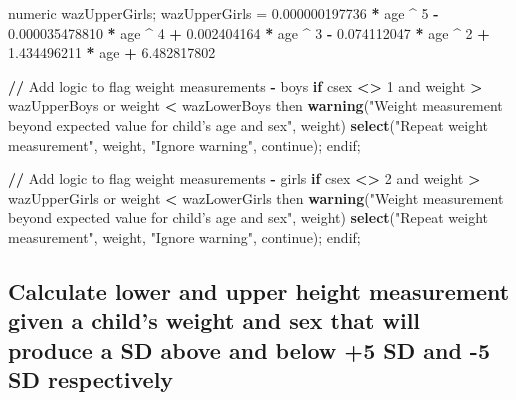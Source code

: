 \documentclass[12pt,a4paper]{article}
\newenvironment{Shaded}{\begin{snugshade}}{\end{snugshade}}
\newcommand{\KeywordTok}[1]{\textcolor[rgb]{0.13,0.29,0.53}{\textbf{#1}}}
\newcommand{\DecValTok}[1]{\textcolor[rgb]{0.00,0.00,0.81}{#1}}
\newcommand{\FloatTok}[1]{\textcolor[rgb]{0.00,0.00,0.81}{#1}}
\newcommand{\StringTok}[1]{\textcolor[rgb]{0.31,0.60,0.02}{#1}}
\newcommand{\ControlFlowTok}[1]{\textcolor[rgb]{0.13,0.29,0.53}{\textbf{#1}}}
\newcommand{\OperatorTok}[1]{\textcolor[rgb]{0.81,0.36,0.00}{\textbf{#1}}}
\newcommand{\ErrorTok}[1]{\textcolor[rgb]{0.64,0.00,0.00}{\textbf{#1}}}
\newcommand{\NormalTok}[1]{#1}
\theoremstyle{definition}
\theoremstyle{definition}
\theoremstyle{definition}
\theoremstyle{remark}
\begin{document}
\begin{Shaded}
\begin{Highlighting}[]
\NormalTok{numeric wazUpperGirls;}
\NormalTok{wazUpperGirls =}\StringTok{ }\FloatTok{0.000000197736} \OperatorTok{*}\StringTok{ }\NormalTok{age }\OperatorTok{^}\StringTok{ }\DecValTok{5} \OperatorTok{-}\StringTok{ }\FloatTok{0.000035478810} \OperatorTok{*}\StringTok{ }\NormalTok{age }\OperatorTok{^}\StringTok{ }\DecValTok{4}
               \OperatorTok{+}\StringTok{ }\FloatTok{0.002404164} \OperatorTok{*}\StringTok{ }\NormalTok{age }\OperatorTok{^}\StringTok{ }\DecValTok{3} \OperatorTok{-}\StringTok{ }\FloatTok{0.074112047} \OperatorTok{*}\StringTok{ }\NormalTok{age }\OperatorTok{^}\StringTok{ }\DecValTok{2}
               \OperatorTok{+}\StringTok{ }\FloatTok{1.434496211} \OperatorTok{*}\StringTok{ }\NormalTok{age }\OperatorTok{+}\StringTok{ }\FloatTok{6.482817802}
               
\OperatorTok{/}\ErrorTok{/}\StringTok{ }\NormalTok{Add logic to flag weight measurements }\OperatorTok{-}\StringTok{ }\NormalTok{boys}
\ControlFlowTok{if}\NormalTok{ csex }\OperatorTok{<}\ErrorTok{>}\StringTok{ }\DecValTok{1}\NormalTok{ and weight }\OperatorTok{>}\StringTok{ }\NormalTok{wazUpperBoys or weight }\OperatorTok{<}\StringTok{ }\NormalTok{wazLowerBoys then}
  \KeywordTok{warning}\NormalTok{(}\StringTok{"Weight measurement beyond expected value for child's age and sex"}\NormalTok{,}
\NormalTok{          weight)}
          \KeywordTok{select}\NormalTok{(}\StringTok{"Repeat weight measurement"}\NormalTok{, weight,}
                 \StringTok{"Ignore warning"}\NormalTok{, continue);}
\NormalTok{endif;}

\OperatorTok{/}\ErrorTok{/}\StringTok{ }\NormalTok{Add logic to flag weight measurements }\OperatorTok{-}\StringTok{ }\NormalTok{girls}
\ControlFlowTok{if}\NormalTok{ csex }\OperatorTok{<}\ErrorTok{>}\StringTok{ }\DecValTok{2}\NormalTok{ and weight }\OperatorTok{>}\StringTok{ }\NormalTok{wazUpperGirls or weight }\OperatorTok{<}\StringTok{ }\NormalTok{wazLowerGirls then}
  \KeywordTok{warning}\NormalTok{(}\StringTok{"Weight measurement beyond expected value for child's age and sex"}\NormalTok{,}
\NormalTok{          weight)}
          \KeywordTok{select}\NormalTok{(}\StringTok{"Repeat weight measurement"}\NormalTok{, weight,}
                 \StringTok{"Ignore warning"}\NormalTok{, continue);}
\NormalTok{endif;}
\end{Highlighting}
\end{Shaded}

\newpage

\hypertarget{calculate-lower-and-upper-height-measurement-given-a-childs-weight-and-sex-that-will-produce-a-sd-above-and-below-5-sd-and--5-sd-respectively}{%
\subsection{Calculate lower and upper height measurement given a child's
weight and sex that will produce a SD above and below +5 SD and -5 SD
respectively}\label{calculate-lower-and-upper-height-measurement-given-a-childs-weight-and-sex-that-will-produce-a-sd-above-and-below-5-sd-and--5-sd-respectively}}
\end{document}
